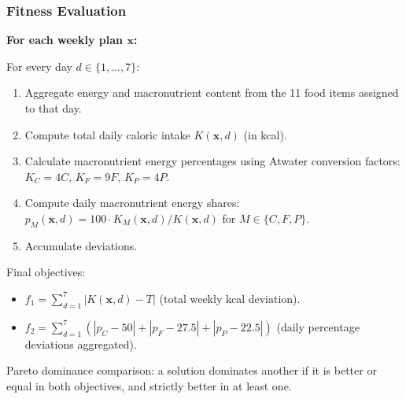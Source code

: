 \documentclass[aspectratio=169,10pt]{beamer}
\begin{document}
\begin{frame}
\frametitle{Fitness Evaluation}

\textbf{For each weekly plan $\mathbf{x}$:}

\vspace{0.2cm}

For every day $d \in \{1, \ldots, 7\}$:
\begin{enumerate}
  \item Aggregate energy and macronutrient content from the 11 food items assigned to that day.
  \item Compute total daily caloric intake $K(\mathbf{x}, d)$ (in kcal).
  \item Calculate macronutrient energy percentages using Atwater conversion factors: $K_C = 4C$, $K_F = 9F$, $K_P = 4P$.
  \item Compute daily macronutrient energy shares: $p_M(\mathbf{x}, d) = 100 \cdot K_M(\mathbf{x}, d) / K(\mathbf{x}, d)$ for $M \in \{C, F, P\}$.
  \item Accumulate deviations.
\end{enumerate}

\vspace{0.2cm}

Final objectives:
\begin{itemize}
  \item $f_1 = \sum_{d=1}^{7} |K(\mathbf{x}, d) - T|$ (total weekly kcal deviation).
  \item $f_2 = \sum_{d=1}^{7} (|p_C - 50| + |p_F - 27.5| + |p_P - 22.5|)$ (daily percentage deviations aggregated).
\end{itemize}

\vspace{0.2cm}

Pareto dominance comparison: a solution dominates another if it is better or equal in both objectives, and strictly better in at least one.

\end{frame}
\end{document}
